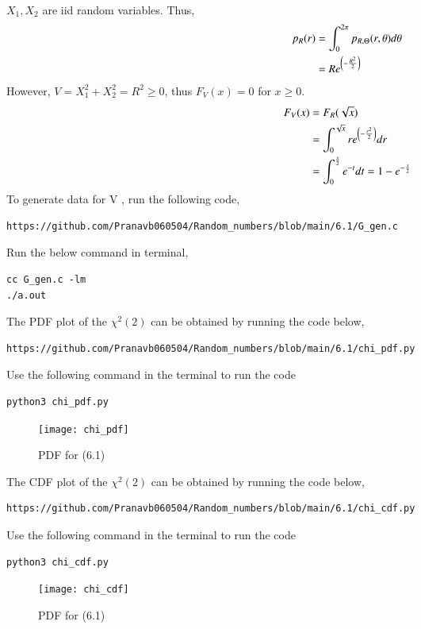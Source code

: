 \documentclass[journal,12pt,twocolumn]{IEEEtran}
\renewcommand\thesection{\arabic{section}}
\begin{document}
\begin{enumerate}[label=\thesection.\arabic*
,ref=\thesection.\theenumi]
\begin{align}
		\end{align}
   $X_1, X_2$ are iid random variables. Thus,
		\begin{align}
			p_R(r) &= \int_{0}^{2\pi}p_{R, \Theta}(r, \theta)d\theta \\
			&= R e^{\left(-\frac{R^2}{2}\right)}
		\end{align}
However, $V = X_1^2 + X_2^2 = R^2 \geq 0$, thus $F_V(x) = 0$ for $x \geq 0$.
		\begin{align}
			F_V(x) &= F_R(\sqrt{x}) \\ 
			&= \int_{0}^{\sqrt{x}}r e^{\left(-\frac{r^2}{2}\right)}dr \\
			&= \int_{0}^{\frac{x}{2}}e^{-t}dt = 1 - e^{-\frac{x}{2}}
		\end{align}
To generate data for V , run the following code,
\begin{lstlisting}
https://github.com/Pranavb060504/Random_numbers/blob/main/6.1/G_gen.c
\end{lstlisting}
Run the below command in terminal,
\begin{lstlisting}
cc G_gen.c -lm
./a.out
\end{lstlisting}
The PDF plot of the $\chi^{2} (2)$ can be obtained by running the code below,
\begin{lstlisting}
https://github.com/Pranavb060504/Random_numbers/blob/main/6.1/chi_pdf.py
\end{lstlisting}
Use the following command in the terminal to run the code
\begin{lstlisting}
python3 chi_pdf.py
\end{lstlisting}
\begin{figure}
\texttt{[image: chi\_pdf]}
\caption{PDF for (6.1)}
\label{fig:chi_PDF}
\end{figure}
The CDF plot of the $\chi^{2} (2)$ can be obtained by running the code below,
\begin{lstlisting}
https://github.com/Pranavb060504/Random_numbers/blob/main/6.1/chi_cdf.py
\end{lstlisting}
Use the following command in the terminal to run the code
\begin{lstlisting}
python3 chi_cdf.py
\end{lstlisting}
\begin{figure}
\texttt{[image: chi\_cdf]}
\caption{PDF for (6.1)}
\label{fig:chi_PDF}
\end{figure}


\end{enumerate}
\end{document}
